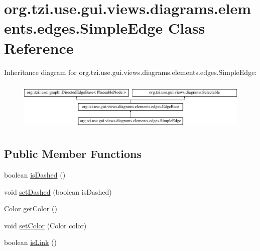 \hypertarget{classorg_1_1tzi_1_1use_1_1gui_1_1views_1_1diagrams_1_1elements_1_1edges_1_1_simple_edge}{\section{org.\-tzi.\-use.\-gui.\-views.\-diagrams.\-elements.\-edges.\-Simple\-Edge Class Reference}
\label{classorg_1_1tzi_1_1use_1_1gui_1_1views_1_1diagrams_1_1elements_1_1edges_1_1_simple_edge}
}
Inheritance diagram for org.\-tzi.\-use.\-gui.\-views.\-diagrams.\-elements.\-edges.\-Simple\-Edge\-:\begin{figure}[H]
\begin{center}
\leavevmode
\includegraphics[height=2.386364cm]{classorg_1_1tzi_1_1use_1_1gui_1_1views_1_1diagrams_1_1elements_1_1edges_1_1_simple_edge}
\end{center}
\end{figure}
\subsection*{Public Member Functions}
\begin{DoxyCompactItemize}
\item 
boolean \hyperlink{classorg_1_1tzi_1_1use_1_1gui_1_1views_1_1diagrams_1_1elements_1_1edges_1_1_simple_edge_aa7f98ca4723e09d6bcd0a8a3fdc0919d}{is\-Dashed} ()
\item 
void \hyperlink{classorg_1_1tzi_1_1use_1_1gui_1_1views_1_1diagrams_1_1elements_1_1edges_1_1_simple_edge_a521385cb0c9b69506443f13aa2f85988}{set\-Dashed} (boolean is\-Dashed)
\item 
Color \hyperlink{classorg_1_1tzi_1_1use_1_1gui_1_1views_1_1diagrams_1_1elements_1_1edges_1_1_simple_edge_aeba7738894521769d1a0a019bd9a2dbf}{get\-Color} ()
\item 
void \hyperlink{classorg_1_1tzi_1_1use_1_1gui_1_1views_1_1diagrams_1_1elements_1_1edges_1_1_simple_edge_a29616cb4e5fcb758bb80b07b9157916f}{set\-Color} (Color color)
\item 
boolean \hyperlink{classorg_1_1tzi_1_1use_1_1gui_1_1views_1_1diagrams_1_1elements_1_1edges_1_1_simple_edge_acc2b993672d9401740b2f396c8ff5a83}{is\-Link} ()
\end{DoxyCompactItemize}
